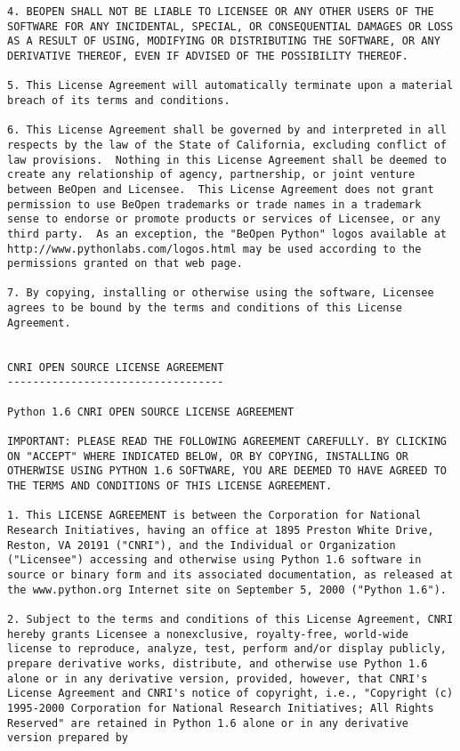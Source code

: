 \begin{verbatim}
4. BEOPEN SHALL NOT BE LIABLE TO LICENSEE OR ANY OTHER USERS OF THE
SOFTWARE FOR ANY INCIDENTAL, SPECIAL, OR CONSEQUENTIAL DAMAGES OR LOSS
AS A RESULT OF USING, MODIFYING OR DISTRIBUTING THE SOFTWARE, OR ANY
DERIVATIVE THEREOF, EVEN IF ADVISED OF THE POSSIBILITY THEREOF.

5. This License Agreement will automatically terminate upon a material
breach of its terms and conditions.

6. This License Agreement shall be governed by and interpreted in all
respects by the law of the State of California, excluding conflict of
law provisions.  Nothing in this License Agreement shall be deemed to
create any relationship of agency, partnership, or joint venture
between BeOpen and Licensee.  This License Agreement does not grant
permission to use BeOpen trademarks or trade names in a trademark
sense to endorse or promote products or services of Licensee, or any
third party.  As an exception, the "BeOpen Python" logos available at
http://www.pythonlabs.com/logos.html may be used according to the
permissions granted on that web page.

7. By copying, installing or otherwise using the software, Licensee
agrees to be bound by the terms and conditions of this License
Agreement.


CNRI OPEN SOURCE LICENSE AGREEMENT
----------------------------------

Python 1.6 CNRI OPEN SOURCE LICENSE AGREEMENT

IMPORTANT: PLEASE READ THE FOLLOWING AGREEMENT CAREFULLY. BY CLICKING
ON "ACCEPT" WHERE INDICATED BELOW, OR BY COPYING, INSTALLING OR
OTHERWISE USING PYTHON 1.6 SOFTWARE, YOU ARE DEEMED TO HAVE AGREED TO
THE TERMS AND CONDITIONS OF THIS LICENSE AGREEMENT.

1. This LICENSE AGREEMENT is between the Corporation for National
Research Initiatives, having an office at 1895 Preston White Drive,
Reston, VA 20191 ("CNRI"), and the Individual or Organization
("Licensee") accessing and otherwise using Python 1.6 software in
source or binary form and its associated documentation, as released at
the www.python.org Internet site on September 5, 2000 ("Python 1.6").

2. Subject to the terms and conditions of this License Agreement, CNRI
hereby grants Licensee a nonexclusive, royalty-free, world-wide
license to reproduce, analyze, test, perform and/or display publicly,
prepare derivative works, distribute, and otherwise use Python 1.6
alone or in any derivative version, provided, however, that CNRI's
License Agreement and CNRI's notice of copyright, i.e., "Copyright (c)
1995-2000 Corporation for National Research Initiatives; All Rights
Reserved" are retained in Python 1.6 alone or in any derivative
version prepared by


\end{verbatim}
